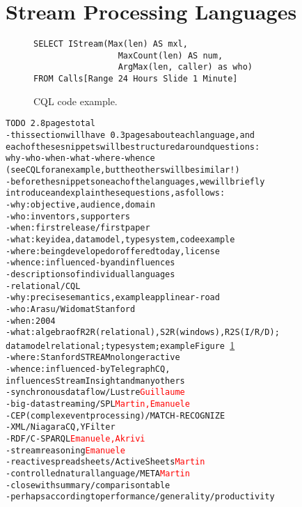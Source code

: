 \section{Stream Processing Languages}\label{sec:languages}

\begin{figure}
\begin{lstlisting}
SELECT IStream(Max(len) AS mxl,
                 MaxCount(len) AS num,
                 ArgMax(len, caller) as who)
FROM Calls[Range 24 Hours Slide 1 Minute]
\end{lstlisting}
\vspace*{-4mm}
\caption{\label{fig:cql}CQL code example.}
\end{figure}

\begin{alltt}TODO\scriptsize ~2.8 pages total
- this section will have ~0.3 pages about each language, and
  each of these snippets will be structured around questions:
  why-who-when-what-where-whence
  (see CQL for an example, but the others will be similar!)
- before the snippets on each of the languages, we will briefly
  introduce and explain these questions, as follows:
  - why: objective, audience, domain
  - who: inventors, supporters
  - when: first release / first paper
  - what: key idea, data model, type system, code example
  - where: being developed or offered today, license
  - whence: influenced-by and influences
- descriptions of individual languages
  - relational / CQL \cite{arasu_babu_widom_2006}
    - why: precise semantics \cite{arasu_widom_2004}, example app linear-road \cite{arasu_et_al_2004}
    - who: Arasu/Widom at Stanford
    - when: 2004
    - what: algebra of R2R (relational), S2R (windows), R2S (I/R/D);
      data model relational; type system \cite{soule_et_al_2016}; example Figure~\ref{fig:cql}
    - where: Stanford STREAM no longer active
    - whence: influenced-by TelegraphCQ \cite{chandrasekaran_et_al_2003},
      influences StreamInsight \cite{ali_et_al_2009} and many others
  - synchronous dataflow / Lustre \cite{caspi_et_al_1987} \textcolor{red}{Guillaume}
  - big-data streaming / SPL \cite{hirzel_schneider_gedik_2017} \textcolor{red}{Martin, Emanuele}
  - CEP (complex event processing) / MATCH-RECOGNIZE \cite{zemke_et_al_2007} \cite{hirzel_2012}
  - XML / NiagaraCQ \cite{chen_et_al_2000}, YFilter \cite{diao_et_al_2002}
  - RDF / C-SPARQL \cite{barbieri_et_al_2009} \textcolor{red}{Emanuele, Akrivi}
  - stream reasoning \textcolor{red}{Emanuele}
  - reactive spreadsheets / ActiveSheets \cite{vaziri_et_al_2014} \textcolor{red}{Martin}
  - controlled natural language / META \cite{arnold_et_al_2016} \textcolor{red}{Martin}
- close with summary/comparison table
  - perhaps according to performance/generality/productivity
\end{alltt}
